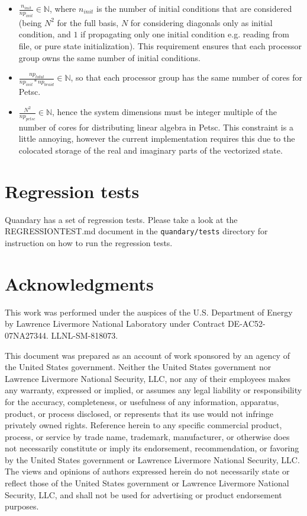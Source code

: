 \documentclass[11pt]{article}
\begin{document}
    \begin{itemize}
    \item $\frac{n_{init}}{np_{init}} \in \mathds{N}$, where $n_{init}$ is
      the number of initial conditions that are considered (being $N^2$ for
      the full basis, $N$ for considering diagonals only as initial
      condition, and $1$ if propagating only one initial condition e.g.
      reading from file, or pure state initialization). This requirement
      ensures that each processor group owns the same number of initial
      conditions.
    \item $\frac{np_{total}}{np_{init}*np_{braid}} \in \mathds{N}$, so that
      each processor group has the same number of cores for Petsc.
    \item $\frac{N^2}{np_{petsc}} \in \mathds{N}$, hence the system
      dimensions must be integer multiple of the number of cores for
      distributing linear algebra in Petsc. This constraint is a little
      annoying, however the current implementation requires this due to the
      colocated storage of the real and imaginary parts of the vectorized
      state.
    \end{itemize}

\section{Regression tests}
Quandary has a set of regression tests. Please take a look at the
REGRESSIONTEST.md document in the \verb+quandary/tests+ directory for 
instruction on how to run the regression tests. 

    \section*{Acknowledgments}
    This work was performed under the auspices of the U.S. Department of Energy by Lawrence
    Livermore National Laboratory under Contract DE-AC52-07NA27344. LLNL-SM-818073. 

This document was prepared as an account of work sponsored by an agency of the United States
government. Neither the United States government nor Lawrence Livermore National Security, LLC,
nor any of their employees makes any warranty, expressed or implied, or assumes any legal
liability or responsibility for the accuracy, completeness, or usefulness of any information,
apparatus, product, or process disclosed, or represents that its use would not infringe
privately owned rights. Reference herein to any specific commercial product, process, or service
by trade name, trademark, manufacturer, or otherwise does not necessarily constitute or imply
its endorsement, recommendation, or favoring by the United States government or Lawrence
Livermore National Security, LLC. The views and opinions of authors expressed herein do not
necessarily state or reflect those of the United States government or Lawrence Livermore
National Security, LLC, and shall not be used for advertising or product endorsement purposes.
\end{document}
